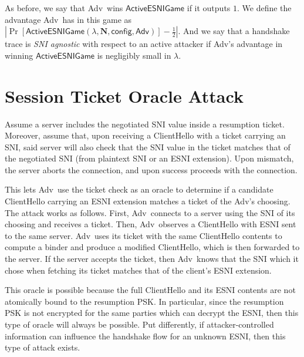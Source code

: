 \documentclass{article}
\newcommand{\adv}{{\sf Adv}}
\newcommand{\madv}{\mathsf{Adv}}
\begin{document}

As before, we say that \adv\ wins $\mathsf{ActiveESNIGame}$ if it outputs $1$. We define the advantage \adv\ has in this game as
$|\Pr[\mathsf{ActiveESNIGame}(\lambda, \mathbf{N}, \mathsf{config}, \madv)] - \frac{1}{2}|$. And we say that a handshake trace
is \emph{SNI agnostic} with respect to an active attacker if \adv's advantage in winning $\mathsf{ActiveESNIGame}$ is negligibly 
small in $\lambda$.

\section{Session Ticket Oracle Attack}

Assume a server includes the negotiated SNI value inside
a resumption ticket. Moreover, assume that, upon receiving a ClientHello with a ticket
carrying an SNI, said server will also check that the SNI value in the ticket matches 
that of the negotiated SNI (from plaintext SNI or an ESNI extension). Upon mismatch, the
server aborts the connection, and upon success proceeds with the connection. 

This lets \adv\ use the ticket check as an oracle to determine if a candidate ClientHello
carrying an ESNI extension matches a ticket of the \adv's choosing. The attack works as follows.
First, \adv\ connects to a server using the SNI of its choosing and receives a ticket. Then,
\adv\ observes a ClientHello with ESNI sent to the same server. \adv\ uses its ticket with 
the same ClientHello contents to compute a binder and produce a modified ClientHello, which
is then forwarded to the server. If the server accepts the ticket, then \adv\ knows that the
SNI which it chose when fetching its ticket matches that of the client's ESNI extension. 

This oracle is possible because the full ClientHello and its ESNI contents are not atomically
bound to the resumption PSK. In particular, since the resumption PSK is not encrypted for the
same parties which can decrypt the ESNI, then this type of oracle will always be possible. 
Put differently, if attacker-controlled information can influence the handshake flow for an 
unknown ESNI, then this type of attack exists.

\end{document}
